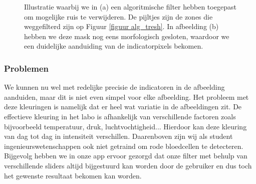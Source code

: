 \documentclass[a4paper,kulak]{kulakarticle}
\begin{document}
\begin{figure}[H]
	\centering
	\qquad
	
	\caption{Illustratie waarbij we in (a) een algoritmische filter hebben toegepast om mogelijke ruis te verwijderen. De pijltjes zijn de zones die weggefilterd zijn op Figuur \ref{figuur alg_tresh}. In afbeelding (b) hebben we deze mask nog eens morfologisch gesloten, waardoor we een duidelijke aanduiding van de indicatorpixels bekomen.}
	\label{figuur morf}
\end{figure}

\subsubsection{Problemen}
We kunnen nu wel met redelijke precisie de indicatoren in de afbeelding aanduiden, maar dit is niet even simpel voor elke afbeelding.
Het probleem met deze kleuringen is namelijk dat er heel wat variatie in de afbeeldingen zit. De effectieve kleuring in het labo is afhankelijk van verschillende factoren zoals bijvoorbeeld temperatuur, druk, luchtvochtigheid... Hierdoor kan deze kleuring van dag tot dag in intensiteit verschillen. Daarenboven zijn wij als student ingenieurswetenschappen ook niet getraind om rode bloedcellen te detecteren. Bijgevolg hebben we in onze app ervoor gezorgd dat onze filter met behulp van verschillende sliders altijd bijgestuurd kan worden door de gebruiker en dus toch het gewenste resultaat bekomen kan worden.
\end{document}
